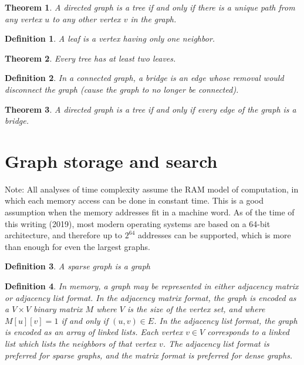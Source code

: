 \documentclass[a4paper]{article}
\newtheorem{mytheorem}{Theorem}
\newtheorem{mydef}{Definition}
\numberwithin{mytheorem}{section}
\numberwithin{mydef}{section}
\numberwithin{example}{section}
\begin{document}
\begin{mytheorem} A directed graph is a tree if and only if there is a unique path from any vertex $u$ to any other vertex $v$ in the graph. 
\end{mytheorem}

\begin{mydef} A leaf is a vertex having only one neighbor.
\end{mydef}

\begin{mytheorem} Every tree has at least two leaves. 
\end{mytheorem}

\begin{mydef} In a connected graph, a bridge is an edge whose removal would disconnect the graph (cause the graph to no longer be connected).
\end{mydef}

\begin{mytheorem} A directed graph is a tree if and only if every edge of the graph is a bridge.
\end{mytheorem}




\section{Graph storage and search}

Note: All analyses of time complexity assume the RAM model of computation, in which each memory access can be done in constant time. This is a good assumption when the memory addresses fit in a machine word. As of the time of this writing (2019), most modern operating systems are based on a 64-bit architecture, and therefore up to $2^{64}$ addresses can be supported, which is more than enough for even the largest graphs. 

\begin{mydef} A sparse graph is a graph
\end{mydef}

\begin{mydef} In memory, a graph may be represented in either adjacency matrix or adjacency list format. In the adjacency matrix format, the graph is encoded as a $V \times V$ binary matrix $M$ where $V$ is the size of the vertex set, and where $M[u][v] = 1$ if and only if $(u,v) \in E$. In the adjacency list format, the graph is encoded as an array of linked lists. Each vertex $v \in V$ corresponds to a linked list which lists the neighbors of that vertex $v$. The adjacency list format is preferred for sparse graphs, and the matrix format is preferred for dense graphs. 
\end{mydef}
\end{document}
